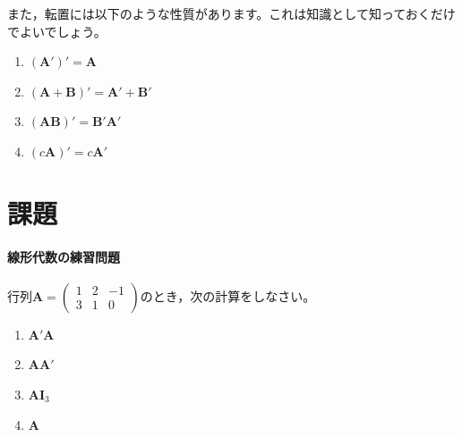 \documentclass{ltjsbook}
\begin{document}
また，転置には以下のような性質があります。これは知識として知っておくだけでよいでしょう。
\begin{enumerate}
    \item $(\bm{A} ')' = \bm{A}$
    \item $(\bm{A} + \bm{B} )' = \bm{A}' + \bm{B}'$
    \item $(\bm{A} \bm{B})'=\bm{B}'\bm{A}'$
    \item $(c\bm{A})'=c\bm{A}'$
\end{enumerate}

\section{課題}
\paragraph{線形代数の練習問題}行列$\bm{A}=\begin{pmatrix}1 & 2 & -1\\3 & 1 & 0\end{pmatrix}$のとき，次の計算をしなさい。
\begin{enumerate}
    \item $\bm{A}'\bm{A}$
    \item $\bm{AA}'$
    \item $\bm{A}\bm{I}_3$
    \item $\bm{A}$
\end{enumerate}
\end{document}
